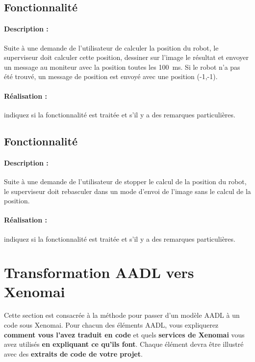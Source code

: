 \documentclass[11pt, a4paper]{paper}
\newcounter{cptreq}
\begin{document}
\subsection{Fonctionnalité \thecptreq}

\paragraph{Description :} Suite à une demande de l'utilisateur de calculer la position du robot, le superviseur doit calculer cette position, dessiner sur l'image le résultat et envoyer un message au moniteur avec la position toutes les 100~ms. Si le robot n'a pas été trouvé, un message de position est envoyé avec une position (-1,-1).

\paragraph{\color{black}Réalisation :}  {\color{red} indiquez si la fonctionnalité est traitée et s'il y a des remarques particulières.}
\subsection{Fonctionnalité \thecptreq}

\paragraph{Description :} Suite à une demande de l'utilisateur de stopper le calcul de la position du robot, le superviseur doit rebasculer dans un mode d'envoi de l'image sans le calcul de la position.

\paragraph{\color{black}Réalisation :}  {\color{red} indiquez si la fonctionnalité est traitée et s'il y a des remarques particulières.}


\section{Transformation AADL vers Xenomai}
 
 {\color{red} Cette section est consacrée à la méthode pour passer d'un modèle AADL à un code sous Xenomai. Pour chacun des éléments AADL, vous expliquerez {\bf comment vous l'avez traduit en code} et quels {\bf services de Xenomai} vous avez utilisés {\bf en expliquant ce qu'ils font}. Chaque élément devra être illustré avec des {\bf extraits de code de votre projet}.}
 
\end{document}
